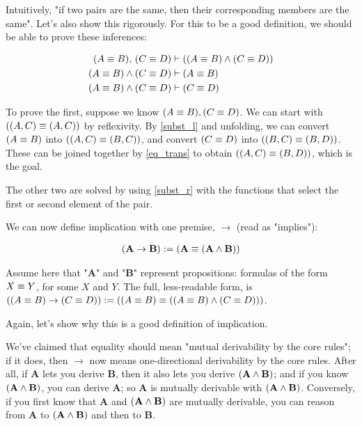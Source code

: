 \documentclass{article}
\begin{document}
  Intuitively, "if two pairs are the same, then their corresponding members are the same". Let's also show this rigorously. For this to be a good definition, we should be able to prove these inferences:
  
  \begin{align*}
    (A \equiv B) ,\, (C \equiv D) &\vdash ((A \equiv B) \wedge (C \equiv D)) \\
    (A \equiv B) \wedge (C \equiv D) &\vdash (A \equiv B) \\
    (A \equiv B) \wedge (C \equiv D) &\vdash (C \equiv D) \\
  \end{align*}
  
  To prove the first, suppose we know $(A \equiv B), (C \equiv D)$. We can start with $((A,C) \equiv (A,C))$ by reflexivity. By \eqref{subst_l} and unfolding, we can convert $(A \equiv B)$ into $((A,C) \equiv (B,C))$, and convert $(C \equiv D)$ into $((B,C) \equiv (B,D))$. These can be joined together by \eqref{eq_trans} to obtain $((A,C) \equiv (B,D))$, which is the goal.
  
  The other two are solved by using \eqref{subst_r} with the functions that select the first or second element of the pair.
  
  We can now define implication with one premise, $\to$ (read as "implies"):
  
  \newcommand{\prop}[1]{\mathbf{#1}}
  
  \begin{align*}
    (\prop{A} \to \prop{B}) := (\prop{A} \equals (\prop{A} \and \prop{B}))
  \end{align*}
  
  Assume here that "$\prop{A}$" and "$\prop{B}$" represent propositions: formulas of the form $X \equiv Y$, for some $X$ and $Y$. The full, less-readable form, is $((A \equiv B) \to (C \equiv D)):= ((A \equiv B) \equiv ((A \equiv B) \wedge (C \equiv D)))$.
  
  Again, let's show why this is a good definition of implication.
  
  We've claimed that equality should mean "mutual derivability by the core rules"; if it does, then $\to$ now means one-directional derivability by the core rules.
  After all, if $\prop{A}$ lets you derive $\prop{B}$, then it also lets you derive $(\prop{A} \and \prop{B})$; and if you know $(\prop{A} \and \prop{B})$, you can derive $\prop{A}$; so $\prop{A}$ is mutually derivable with $(\prop{A} \and \prop{B})$.
  Conversely, if you first know that $\prop{A}$ and $(\prop{A} \and \prop{B})$ are mutually derivable, you can reason from $\prop{A}$ to $(\prop{A} \and \prop{B})$ and then to $\prop{B}$.
  
\end{document}
